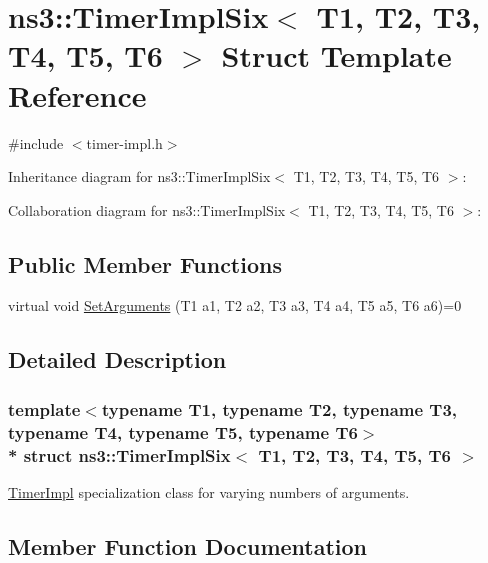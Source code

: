 \hypertarget{structns3_1_1TimerImplSix}{}\section{ns3\+:\+:Timer\+Impl\+Six$<$ T1, T2, T3, T4, T5, T6 $>$ Struct Template Reference}
\label{structns3_1_1TimerImplSix}


{\ttfamily \#include $<$timer-\/impl.\+h$>$}



Inheritance diagram for ns3\+:\+:Timer\+Impl\+Six$<$ T1, T2, T3, T4, T5, T6 $>$\+:


Collaboration diagram for ns3\+:\+:Timer\+Impl\+Six$<$ T1, T2, T3, T4, T5, T6 $>$\+:
\subsection*{Public Member Functions}
\begin{DoxyCompactItemize}
\item 
virtual void \hyperlink{structns3_1_1TimerImplSix_a2ec4fe64d422ad547d73bcb6bac47741}{Set\+Arguments} (T1 a1, T2 a2, T3 a3, T4 a4, T5 a5, T6 a6)=0
\end{DoxyCompactItemize}


\subsection{Detailed Description}
\subsubsection*{template$<$typename T1, typename T2, typename T3, typename T4, typename T5, typename T6$>$\\*
struct ns3\+::\+Timer\+Impl\+Six$<$ T1, T2, T3, T4, T5, T6 $>$}

\hyperlink{classns3_1_1TimerImpl}{Timer\+Impl} specialization class for varying numbers of arguments. 

\subsection{Member Function Documentation}
